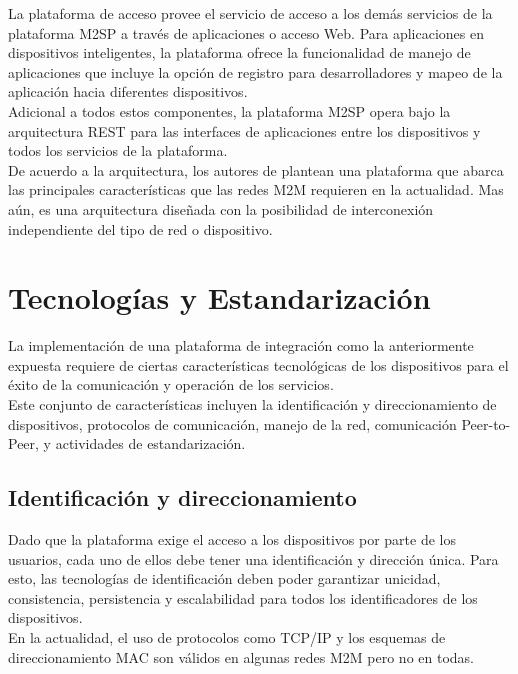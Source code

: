 \documentclass[journal]{IEEEtran}
\begin{document}
La plataforma de acceso provee el servicio de acceso a los demás servicios de la plataforma M2SP a través de aplicaciones o acceso Web. Para aplicaciones en dispositivos inteligentes, la plataforma ofrece la funcionalidad de manejo de aplicaciones que incluye la opción de registro para desarrolladores y mapeo de la aplicación hacia diferentes dispositivos.\\

Adicional a todos estos componentes, la plataforma M2SP opera bajo la arquitectura REST para las interfaces de aplicaciones entre los dispositivos y todos los servicios de la plataforma.\\

De acuerdo a la arquitectura, los autores de \cite{paper1} plantean una plataforma que abarca las principales características que las redes M2M requieren en la actualidad. Mas aún, es una arquitectura diseñada con la posibilidad de interconexión independiente del tipo de red o dispositivo.

\section{Tecnologías y Estandarización}

La implementación de una plataforma de integración como la anteriormente expuesta requiere de ciertas características tecnológicas de los dispositivos para el éxito de la comunicación y operación de los servicios.\\

Este conjunto de características incluyen la identificación y direccionamiento de dispositivos, protocolos de comunicación, manejo de la red, comunicación Peer-to-Peer, y actividades de estandarización.

\subsection{Identificación y direccionamiento}

Dado que la plataforma exige el acceso a los dispositivos por parte de los usuarios, cada uno de ellos debe tener una identificación y dirección única. Para esto, las tecnologías de identificación deben poder garantizar unicidad, consistencia, persistencia y escalabilidad para todos los identificadores de los dispositivos.\\

En la actualidad, el uso de protocolos como TCP/IP y los esquemas de direccionamiento MAC son válidos en algunas redes M2M pero no en todas.
\end{document}
